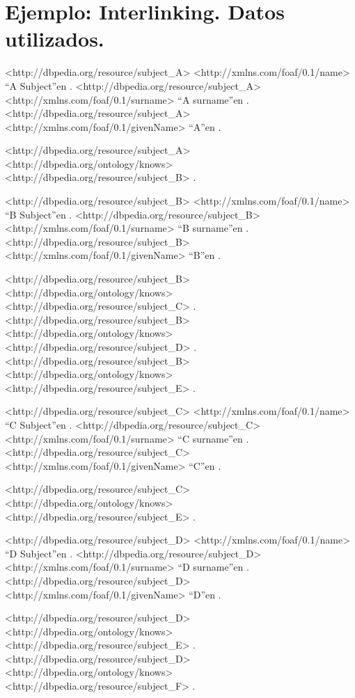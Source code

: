 \chapter{Ejemplo: Interlinking. Datos utilizados.}
\label{ex:interlinking}

\begin{listing}[
  language = XML,
  numbers=left,
  numberstyle=\tiny,
  stepnumber=5,
  numbersep=5pt,
  frame=single,
  caption  = {Datos utilizados para el ejemplo Interlinking},
  label    = ex:interlinkingdata]
<http://dbpedia.org/resource/subject_A> <http://xmlns.com/foaf/0.1/name> ``A Subject''en .
<http://dbpedia.org/resource/subject_A> <http://xmlns.com/foaf/0.1/surname> ``A surname''en .
<http://dbpedia.org/resource/subject_A> <http://xmlns.com/foaf/0.1/givenName> ``A''en .

<http://dbpedia.org/resource/subject_A> <http://dbpedia.org/ontology/knows> <http://dbpedia.org/resource/subject_B> .

<http://dbpedia.org/resource/subject_B> <http://xmlns.com/foaf/0.1/name> ``B Subject''en .
<http://dbpedia.org/resource/subject_B> <http://xmlns.com/foaf/0.1/surname> ``B surname''en .
<http://dbpedia.org/resource/subject_B> <http://xmlns.com/foaf/0.1/givenName> ``B''en .

<http://dbpedia.org/resource/subject_B> <http://dbpedia.org/ontology/knows> <http://dbpedia.org/resource/subject_C> .
<http://dbpedia.org/resource/subject_B> <http://dbpedia.org/ontology/knows> <http://dbpedia.org/resource/subject_D> .
<http://dbpedia.org/resource/subject_B> <http://dbpedia.org/ontology/knows> <http://dbpedia.org/resource/subject_E> .

<http://dbpedia.org/resource/subject_C> <http://xmlns.com/foaf/0.1/name> ``C Subject''en .
<http://dbpedia.org/resource/subject_C> <http://xmlns.com/foaf/0.1/surname> ``C surname''en .
<http://dbpedia.org/resource/subject_C> <http://xmlns.com/foaf/0.1/givenName> ``C''en .

<http://dbpedia.org/resource/subject_C> <http://dbpedia.org/ontology/knows> <http://dbpedia.org/resource/subject_E> .

<http://dbpedia.org/resource/subject_D> <http://xmlns.com/foaf/0.1/name> ``D Subject''en .
<http://dbpedia.org/resource/subject_D> <http://xmlns.com/foaf/0.1/surname> ``D surname''en .
<http://dbpedia.org/resource/subject_D> <http://xmlns.com/foaf/0.1/givenName> ``D''en .

<http://dbpedia.org/resource/subject_D> <http://dbpedia.org/ontology/knows> <http://dbpedia.org/resource/subject_E> .
<http://dbpedia.org/resource/subject_D> <http://dbpedia.org/ontology/knows> <http://dbpedia.org/resource/subject_F> .


\end{listing}
